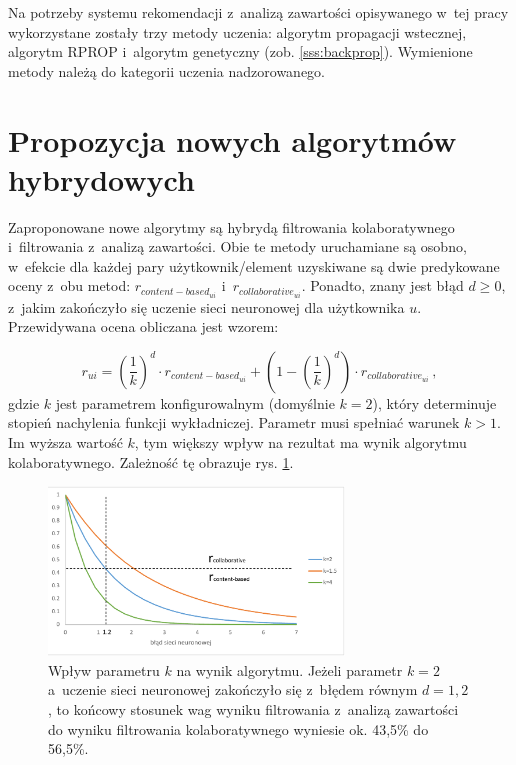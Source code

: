 \documentclass[twoside]{iisthesis}
\begin{document}
		 Na potrzeby systemu rekomendacji z~analizą zawartości opisywanego w~tej pracy wykorzystane zostały trzy metody uczenia: algorytm propagacji wstecznej, algorytm RPROP i~algorytm genetyczny (zob. \ref{sss:backprop}). Wymienione metody należą do kategorii uczenia nadzorowanego. 

	 \section{Propozycja nowych algorytmów hybrydowych}
		 
		 Zaproponowane nowe algorytmy są hybrydą filtrowania kolaboratywnego i~filtrowania z~analizą zawartości. Obie te metody uruchamiane są osobno, w~efekcie dla każdej pary użytkownik\-/element uzyskiwane są dwie  predykowane oceny z~obu metod:  $r_{content-based_{ui}}$ i~$r_{collaborative_{ui}}$. Ponadto, znany jest błąd $d \geq 0$, z~jakim zakończyło się uczenie sieci neuronowej dla użytkownika $u$. Przewidywana ocena obliczana jest wzorem:
		 
		 \begin{equation}
		 	\label{eq:hybrid}		 	
		 	 r_{ui} = (\frac{1}{k})^d \cdot r_{content-based_{ui}} + (1-(\frac{1}{k})^d) \cdot r_{collaborative_{ui}}
		 	\,,
		 \end{equation}		 
		 gdzie $k$ jest parametrem konfigurowalnym (domyślnie $k = 2$), który determinuje stopień nachylenia funkcji wykładniczej. Parametr musi spełniać warunek $k>1$. Im wyższa wartość $k$, tym większy wpływ na rezultat ma wynik algorytmu kolaboratywnego. Zależność tę obrazuje rys. \ref{fig:hybridfunction}.
		 
		 \begin{figure}[!ht] 
		 	\centering
		 	\includegraphics[width=0.7\textwidth]{hybridfunction}
		 	\caption{Wpływ parametru $k$ na wynik algorytmu. Jeżeli parametr $k=2$ a~uczenie sieci neuronowej zakończyło się z~błędem równym $d=1,2$, to końcowy stosunek wag wyniku filtrowania z~analizą zawartości do wyniku filtrowania kolaboratywnego wyniesie ok. 43,5\% do 56,5\%.}
		 	\label{fig:hybridfunction}
		 \end{figure}
		 
\end{document}
